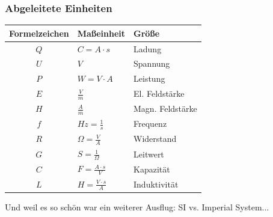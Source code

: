\begin{frame}
    \frametitle{Abgeleitete Einheiten}

    \begin{center}
    \footnotesize
    \renewcommand{\arraystretch}{1.5}
    \begin{tabular}{|c|l|l|}\hline
        \textbf{Formelzeichen} & \textbf{Maßeinheit} & \textbf{Größe} \\ \hline \hline
        $Q$ & $C = A\cdot s$            & Ladung          \\ \hline
        $U$ & $V$                       & Spannung        \\ \hline
        $P$ & $W = V\cdot A$            & Leistung        \\ \hline
        $E$ & $\frac{V}{m}$             & El. Feldstärke  \\ \hline
        $H$ & $\frac{A}{m}$             & Magn. Feldstärke\\ \hline
        $f$ & $Hz = \frac{1}{s}$        & Frequenz        \\ \hline
        $R$ & $\Omega = \frac{V}{A}$    & Widerstand      \\ \hline
        $G$ & $S = \frac{1}{\Omega}$    & Leitwert        \\ \hline
        $C$ & $F = \frac{A\cdot s}{V}$  & Kapazität       \\ \hline
        $L$ & $H = \frac{V\cdot s}{A}$  & Induktivität    \\ \hline
    \end{tabular}
    \end{center}


    Und weil es so schön war ein weiterer Ausflug: SI vs. Imperial System...

\end{frame}

